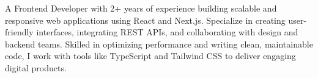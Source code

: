 A Frontend Developer with 2+ years of experience building scalable and responsive web applications using React and Next.js. Specialize in creating user-friendly interfaces, integrating REST APIs, and collaborating with design and backend teams. Skilled in optimizing performance and writing clean, maintainable code, I work with tools like TypeScript and Tailwind CSS to deliver engaging digital products.